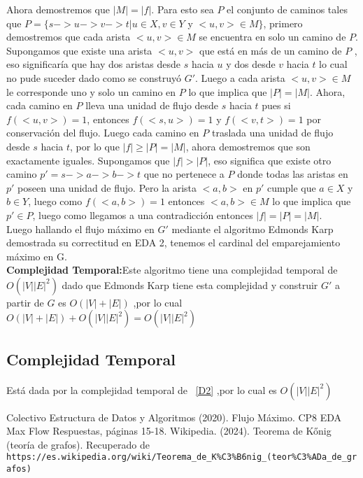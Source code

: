 \documentclass[12pt,a4paper]{report}
\begin{document}
Ahora demostremos que $|M|=|f|$. Para esto sea $P$ el conjunto de caminos tales que $P=\{s->u->v->t|u \in X, v \in Y$ y $<u,v> \in M\}$, primero demostremos que cada arista $<u,v> \in M$ se encuentra en solo un camino de $P$. Supongamos que existe una arista $<u,v>$ que est\'a en m\'as de un camino de $P$ , eso significar\'ia que hay dos aristas desde $s$ hacia $u$ y dos desde $v$ hacia $t$ lo cual no pude suceder dado como se construy\'o $G'$. Luego a cada arista $<u,v> \in M$ le corresponde uno y solo un camino en $P$ lo que implica que $|P|=|M|$. Ahora, cada camino en $P$ lleva una unidad de flujo desde $s$ hacia $t$ pues si $f(<u,v>)=1$, entonces $f(<s,u>)=1$ y $f(<v,t>)=1$ por conservaci\'on del flujo. Luego cada camino en $P$ traslada una unidad de flujo desde $s$ hacia $t$, por lo que $|f| \geq |P|=|M|$, ahora demostremos que son exactamente iguales. Supongamos que $|f| > |P|$, eso significa que existe otro camino $p'=s->a->b->t$ que no pertenece a $P$ donde todas las aristas en $p'$ poseen una unidad de flujo. Pero la arista $<a,b>$ en $p'$ cumple que $a \in X$ y $b \in Y$, luego como $f(<a,b>)=1$ entonces $<a,b> \in M$ lo que implica que $p' \in P$, luego como llegamos a una contradicci\'on entonces $|f|=|P|=|M|$.\\\newline
Luego hallando el flujo m\'aximo en $G'$ mediante el algoritmo Edmonds Karp demostrada su correctitud en EDA 2, tenemos el cardinal del emparejamiento m\'aximo en G.\\

\textbf{Complejidad Temporal:}Este algoritmo tiene una complejidad temporal de $O(|V||E|^2)$ dado que Edmonds Karp tiene esta complejidad y construir $G'$ a partir de $G$ es $O(|V|+|E|)$ ,por lo cual $O(|V|+|E|)+O(|V||E|^2)=O(|V||E|^2)$

\subsection{Complejidad Temporal}
Est\'a dada por la complejidad temporal de ~\ref{D2} ,por lo  cual es $O(|V||E|^2)$


\renewcommand{\bibname}{Referencias}

\begin{thebibliography}{}

Colectivo Estructura de Datos y Algoritmos (2020). Flujo M\'aximo. CP8 EDA Max Flow Respuestas, p\'aginas 15-18.
Wikipedia. (2024). Teorema de Kőnig (teoría de grafos). Recuperado de \texttt{https://es.wikipedia.org/wiki/Teorema\_de\_K\%C3\%B6nig\_(teor\%C3\%ADa\_de\_grafos)}


\end{thebibliography}
 
\end{document}
